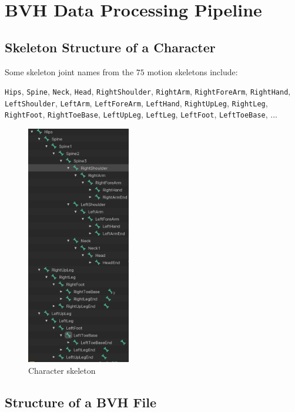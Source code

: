 \section{BVH Data Processing Pipeline}
\label{appendix:BVHData}

\subsection{Skeleton Structure of a Character}
\label{appendix:BVHData:skeleton}

Some skeleton joint names from the $75$ motion skeletons include:

{
	\small
	\texttt{Hips},
	\texttt{Spine},
	\texttt{Neck},
	\texttt{Head},
	\texttt{RightShoulder},
	\texttt{RightArm},
	\texttt{RightForeArm},
	\texttt{RightHand},
	\texttt{LeftShoulder},
	\texttt{LeftArm},
	\texttt{LeftForeArm},
	\texttt{LeftHand},
	\texttt{RightUpLeg},
	\texttt{RightLeg},
	\texttt{RightFoot},
	\texttt{RightToeBase},
	\texttt{LeftUpLeg},
	\texttt{LeftLeg},
	\texttt{LeftFoot},
	\texttt{LeftToeBase},
	...
}

\begin{figure}[h]
	\centering
	\includegraphics[height=10.5cm]{images/Bone}
	\caption{Character skeleton}
	\label{fig:Bone}
\end{figure}

\subsection{Structure of a BVH File}
\label{appendix:BVHData:BVHStructure}

